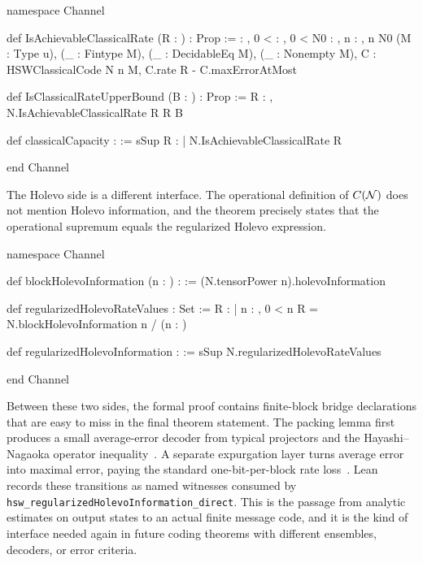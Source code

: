 \documentclass[10pt,a4paper]{article}
\newif\ifqitLineFocused
\newcommand{\qitHighlightSpan}[2]{%
	\ifnum\value{lstnumber}<#1\relax
	\else
		\ifnum\value{lstnumber}>#2\relax
		\else
			\qitLineFocusedtrue
		\fi
	\fi
}
\begin{document}
\begin{qitleancode}[title={Operational classical capacity},
qit focus={\qitHighlightSpan{4}{5}\qitHighlightSpan{8}{9}\qitHighlightSpan{14}{15}}]
namespace Channel

def IsAchievableClassicalRate (R : \mathbbR) : Prop :=
  \forall \delta : \mathbbR, 0 < \delta \to \forall \epsilon : \mathbbR, 0 < \epsilon \to
    \exists N0 : \mathbbN, \forall n : \mathbbN, n \ge N0 \to
      \exists (M : Type u), \exists (_ : Fintype M),
        \exists (_ : DecidableEq M), \exists (_ : Nonempty M),
          \exists C : HSWClassicalCode N n M,
            C.rate \ge R - \delta \wedge C.maxErrorAtMost \epsilon

def IsClassicalRateUpperBound (B : \mathbbR) : Prop :=
  \forall R : \mathbbR, N.IsAchievableClassicalRate R \to R \le B

def classicalCapacity : \mathbbR :=
  sSup {R : \mathbbR | N.IsAchievableClassicalRate R}

end Channel
\end{qitleancode}
	
The Holevo side is a different interface. The operational definition of $C({\cal N})$ does not mention Holevo information, and the theorem precisely states that the operational supremum equals the regularized Holevo expression.

\begin{qitleancode}[title={Regularized Holevo information}]
namespace Channel

def blockHolevoInformation (n : \mathbbN) : \mathbbR :=
  (N.tensorPower n).holevoInformation

def regularizedHolevoRateValues : Set \mathbbR :=
  {R : \mathbbR | \exists n : \mathbbN, 0 < n \wedge
    R = N.blockHolevoInformation n / (n : \mathbbR)}

def regularizedHolevoInformation : \mathbbR :=
  sSup N.regularizedHolevoRateValues

end Channel
\end{qitleancode}
	
	Between these two sides, the formal proof contains finite-block bridge
	declarations that are easy to miss in the final theorem statement.  The
	packing lemma first produces a small average-error decoder from typical
	projectors and the Hayashi--Nagaoka operator inequality~\cite{HayashiNagaoka2003,KhatriLamiWilde2025Principles}.  A separate expurgation
	layer turns average error into maximal error, paying the standard
	one-bit-per-block rate loss~\cite{KhatriLamiWilde2025Principles}.  Lean records
	these transitions as named witnesses consumed by
	\texttt{hsw\_regularizedHolevoInformation\_direct}.  This is the passage from
	analytic estimates on output states to an actual finite message code, and it
	is the kind of interface needed again in future coding theorems with different
	ensembles, decoders, or error criteria.
	
\end{document}
